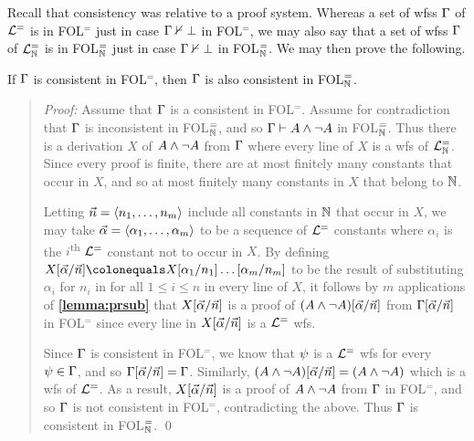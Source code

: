 
Recall that consistency was relative to a proof system.
Whereas a set of wfss $\Gamma$ of $\mathcal{L}^{=}$ is  in FOL$^=$ just in case $\Gamma \nvdash \bot$ in FOL$^=$, we may also say that a set of wfss $\Gamma$ of $\mathcal{L}^{=}_{\mathbb{N}}$ is  in FOL$^=_{\mathbb{N}}$ just in case $\Gamma \nvdash \bot$ in FOL$^=_{\mathbb{N}}$.
We may then prove the following.

\begin{Lthm} \label{lemma:const}
  If $\Gamma$ is consistent in FOL$^=$, then $\Gamma$ is also consistent in FOL$^=_{\mathbb{N}}$.
\end{Lthm}

\begin{quote} 
  \textit{Proof:} Assume that $\Gamma$ is a consistent in FOL$^=$.
  Assume for contradiction that $\Gamma$ is inconsistent in FOL$^=_{\mathbb{N}}$, and so $\Gamma\vdash A\wedge\neg A$ in FOL$^=_{\mathbb{N}}$.
  Thus there is a derivation $X$ of $A\wedge\neg A$ from $\Gamma$ where every line of $X$ is a wfs of $\mathcal{L}^{=}_{\mathbb{N}}$.
  Since every proof is finite, there are at most finitely many constants that occur in $X$, and so at most finitely many constants in $X$ that belong to $\mathbb{N}$.

  Letting $\vec{n}=\langle n_1,\ldots,n_m\rangle$ include all constants in $\mathbb{N}$ that occur in $X$, we may take $\vec{\alpha}=\langle\alpha_1,\ldots,\alpha_m\rangle$ to be a sequence of $\mathcal{L}^{=}$ constants where $\alpha_i$ is the $i$\textsuperscript{th} $\mathcal{L}^{=}$ constant not to occur in $X$.
  By defining $X\unisub{\vec{\alpha}}{\vec{n}}\colonequals X\unisub{\alpha_1}{n_1}\ldots\unisub{\alpha_m}{n_m}$ to be the result of substituting $\alpha_i$ for $n_i$ in for all $1\leq i\leq n$ in every line of $X$, it follows by $m$ applications of \textbf{\ref{lemma:prsub}} that $X[\vec{\alpha}/\vec{n}]$ is a proof of $(A\wedge\neg A)[\vec{\alpha}/\vec{n}]$ from $\Gamma[\vec{\alpha}/\vec{n}]$ in FOL$^=$ since every line in $X[\vec{\alpha}/\vec{n}]$ is a $\mathcal{L}^{=}$ wfs.

  Since $\Gamma$ is consistent in FOL$^=$, we know that $\psi$ is a $\mathcal{L}^{=}$ wfs for every $\psi\in\Gamma$, and so $\Gamma[\vec{\alpha}/\vec{n}]=\Gamma$.
  Similarly, $(A\wedge\neg A)[\vec{\alpha}/\vec{n}]=(A\wedge\neg A)$ which is a wfs of $\mathcal{L}^{=}$. 
  As a result, $X[\vec{\alpha}/\vec{n}]$ is a proof of $A\wedge\neg A$ from $\Gamma$ in FOL$^=$, and so $\Gamma$ is not consistent in FOL$^=$, contradicting the above.
  Thus $\Gamma$ is consistent in FOL$^=_{\mathbb{N}}$.
  \qed
\end{quote}

